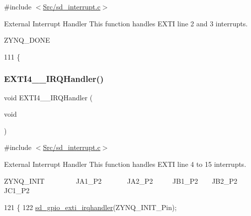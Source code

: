 {\ttfamily \#include $<$\mbox{\hyperlink{sd__interrupt_8c}{Src/sd\+\_\+interrupt.\+c}}$>$}



External Interrupt Handler This function handles E\+X\+TI line 2 and 3 interrupts. 

Z\+Y\+N\+Q\+\_\+\+D\+O\+NE 
\begin{DoxyCode}
111 \{
\end{DoxyCode}
\mbox{\label{group___s_d___interrupt___functions_ga3595b205bdfadf55a525f2d4f438d122}} 
\subsubsection{\texorpdfstring{E\+X\+T\+I4\+\_\+\_\+\+I\+R\+Q\+Handler()}{EXTI4\_15\_IRQHandler()}}
{\footnotesize\ttfamily void E\+X\+T\+I4\+\_\+\_\+\+I\+R\+Q\+Handler (\begin{DoxyParamCaption}\item[{void}]{ }\end{DoxyParamCaption})}



{\ttfamily \#include $<$\mbox{\hyperlink{sd__interrupt_8c}{Src/sd\+\_\+interrupt.\+c}}$>$}



External Interrupt Handler This function handles E\+X\+TI line 4 to 15 interrupts. 

Z\+Y\+N\+Q\+\_\+\+I\+N\+IT ~\newline
~\newline
~\newline
~\newline
~\newline
 J\+A1\+\_\+\+P2 ~\newline
~\newline
~\newline
~\newline
 J\+A2\+\_\+\+P2 ~\newline
~\newline
~\newline
 J\+B1\+\_\+\+P2 ~\newline
~\newline
 J\+B2\+\_\+\+P2 ~\newline
 J\+C1\+\_\+\+P2 
\begin{DoxyCode}
121 \{
122     \mbox{\hyperlink{group___s_d___g_p_i_o___functions_gad80abe67b4fa71703ee86cfc9c6f98ce}{sd\_gpio\_exti\_irqhandler}}(ZYNQ\_INIT\_Pin);      
\end{DoxyCode}

